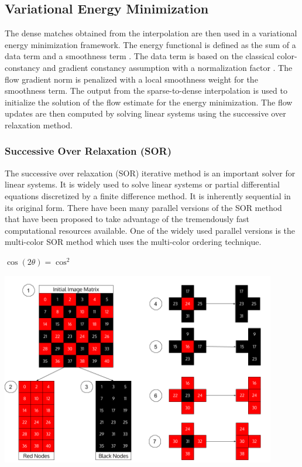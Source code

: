 \documentclass[english]{article}
\begin{document}
	\subsection{Variational Energy Minimization}
	The dense matches obtained from the interpolation are then used in a variational energy minimization framework. The energy functional is defined as the sum of a data term and a smoothness term \cite{x}. The data term is based on the classical color-constancy and gradient constancy assumption with a normalization factor \cite{5}. The flow gradient norm is penalized with a local smoothness weight for the smoothness term. The output from the sparse-to-dense interpolation is used to initialize the solution of the flow estimate for the energy minimization. The flow updates are then computed by solving linear systems using the successive over relaxation method.

	\subsubsection{Successive Over Relaxation (SOR)}
	The successive over relaxation (SOR) iterative method \cite{10} is an important solver for linear systems. It is widely used to solve linear systems or partial differential equations discretized by a finite difference method. It is inherently sequential in its original form. There have been many parallel versions of the SOR method that have been proposed to take advantage of the tremendously fast computational resources available. One of the widely used parallel versions is the multi-color SOR method which uses the multi-color ordering technique.

	\begin{center}
	$\cos (2\theta) = \cos^2$
	\end{center}	

	\begin{center}
	\includegraphics[width=120mm]{results/images/5-rb_order.png}
	\end{center}	
\end{document}
